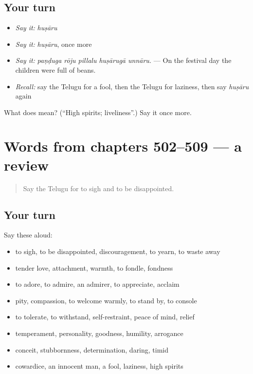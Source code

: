 \subsection*{Your turn}
\begin{itemize}
\raggedright
  \item \emph{Say it:} \emph{huṣāru}
  \item \emph{Say it:} \emph{huṣāru}, once more
  \item \emph{Say it:} \emph{paṇḍuga rōju pillalu huṣārugā unnāru.} — On the festival day the children were full of beans.
  \item \emph{Recall:} say the Telugu for a fool, then the Telugu for laziness, then say \emph{huṣāru} again
\end{itemize}

\begin{tcolorbox}[breakable,colback=teal!4,colframe=teal!35!black,title={Before you move on}]
What does  mean? (\textquotedblleft{}High spirits; liveliness\textquotedblright{}.) Say it once more.
\end{tcolorbox}
\section[(dialogue)]{Words from chapters 502–509 — a review}

\label{lesson:TE-R509-review-502-509}



\begin{quote}
Say the Telugu for to sigh and to be disappointed.
\end{quote}

\subsection*{Your turn}
Say these aloud:

\begin{itemize}
\raggedright
  \item to sigh, to be disappointed, discouragement, to yearn, to waste away
  \item tender love, attachment, warmth, to fondle, fondness
  \item to adore, to admire, an admirer, to appreciate, acclaim
  \item pity, compassion, to welcome warmly, to stand by, to console
  \item to tolerate, to withstand, self-restraint, peace of mind, relief
  \item temperament, personality, goodness, humility, arrogance
  \item conceit, stubbornness, determination, daring, timid
  \item cowardice, an innocent man, a fool, laziness, high spirits
\end{itemize}


